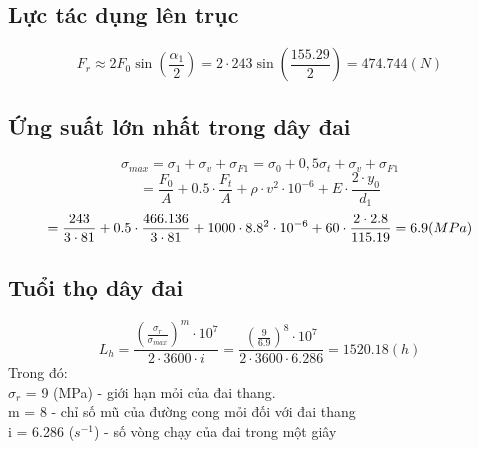 \subsection{Lực tác dụng lên trục}
\[
    F_r \approx 2F_0\sin(\frac{\alpha_1}{2}) = 2\cdot 243\sin(\frac{155.29}{2}) = 474.744 (N) 
\]
\subsection{Ứng suất lớn nhất trong dây đai}
\[
    \sigma_{max} = \sigma_1 + \sigma_v + \sigma_{F1} = \sigma_0 + 0,5\sigma_t + \sigma_v + \sigma_{F1} 
\]
\[
    = \frac{F_0}{A} + 0.5\cdot \frac{F_t}{A} + \rho \cdot v^2\cdot 10^{-6} + E\cdot \frac{2\cdot y_0}{d_1} 
\]
\[
    = \frac{243}{3\cdot 81} + 0.5\cdot \frac{466.136}{3\cdot 81} + 1000\cdot 8.8^2\cdot 10^{-6} + 60\cdot \frac{2\cdot 2.8}{115.19} = 6.9 (MPa) \\
\]
\subsection{Tuổi thọ dây đai}
\[
    L_h = \frac{(\frac{\sigma_r}{\sigma_{max}})^m\cdot 10^7}{2\cdot 3600\cdot i} = \frac{(\frac{9}{6.9})^8\cdot10^7}{2\cdot3600\cdot6.286} = 1520.18 (h)
\]
Trong đó:\\
$\sigma_r$ = 9 (MPa) - giới hạn mỏi của đai thang.\\
m = 8 - chỉ số mũ của đường cong mỏi đối với đai thang\\
i = 6.286 ($s^{-1}$) - số vòng chạy của đai trong một giây\\
\cleardoublepage